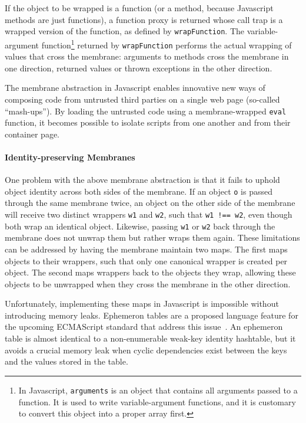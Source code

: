 \documentclass{sig-alternate}
\begin{document}
If the object to be wrapped is a function (or a method, because Javascript methods are just functions), a function proxy is returned whose call trap is a wrapped version of the function, as defined by \texttt{wrapFunction}. The variable-argument function\footnote{In Javascript, \texttt{arguments} is an object that contains all arguments passed to a function. It is used to write variable-argument functions, and it is customary to convert this object into a proper array first.} returned by \texttt{wrapFunction} performs the actual wrapping of values that cross the membrane: arguments to methods cross the membrane in one direction, returned values or thrown exceptions in the other direction.

The membrane abstraction in Javascript enables innovative new ways of composing code from untrusted third parties on a single web page (so-called ``mash-ups''). By loading the untrusted code using a membrane-wrapped \texttt{eval} function, it becomes possible to isolate scripts from one another and from their container page.

\paragraph{Identity-preserving Membranes} One problem with the above membrane abstraction is that it fails to uphold object identity across both sides of the membrane. If an object \texttt{o} is passed through the same membrane twice, an object on the other side of the membrane will receive two distinct wrappers \texttt{w1} and \texttt{w2}, such that \texttt{w1~!==~w2}, even though both wrap an identical object. Likewise, passing \texttt{w1} or \texttt{w2} back through the membrane does not unwrap them but rather wraps them again. These limitations can be addressed by having the membrane maintain two maps. The first maps objects to their wrappers, such that only one canonical wrapper is created per object. The second maps wrappers back to the objects they wrap, allowing these objects to be unwrapped when they cross the membrane in the other direction.

Unfortunately, implementing these maps in Javascript is impossible without introducing memory leaks. Ephemeron tables are a proposed language feature for the upcoming ECMAScript standard that address this issue~\cite{miller10et}. An ephemeron table is almost identical to a non-enumerable weak-key identity hashtable, but it avoids a crucial memory leak when cyclic dependencies exist between the keys and the values stored in the table.
\end{document}
